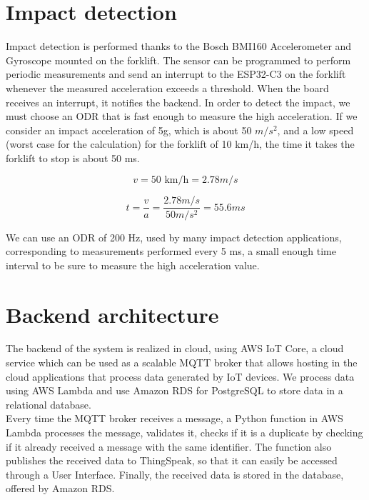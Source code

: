 \section{Impact detection}
Impact detection is performed thanks to the Bosch BMI160 Accelerometer and Gyroscope mounted on the forklift. The sensor can be programmed to perform periodic measurements and send an interrupt to the ESP32-C3 on the forklift whenever the measured acceleration exceeds a threshold. When the board receives an interrupt, it notifies the backend. In order to detect the impact, we must choose an ODR that is fast enough to measure the high acceleration.  If we consider an impact acceleration of 5g, which is about 50 $m/s^2$, and a low  speed (worst case for the calculation) for the forklift of 10 km/h, the time it takes the forklift to stop is about 50 ms.

\begin{equation}
v = 50 \text{ km/h} = 2.78 m/s
\end{equation}

\begin{equation}
t = \frac{v}{a} = \frac{2.78 m/s}{50 m/s^2} = 55.6 ms
\end{equation}

We can use an ODR of 200 Hz, used by many impact detection applications, corresponding to measurements performed every 5 ms, a small enough time interval to be sure to measure the high acceleration value.

\section{Backend architecture}
The backend of the system is realized in cloud, using AWS IoT Core, a cloud service which can be used as a scalable MQTT broker that allows hosting in the cloud applications that process data generated by IoT devices. We process data using AWS Lambda and use Amazon RDS for PostgreSQL to store data in a relational database.\\
Every time the MQTT broker receives a message, a Python function in AWS Lambda processes the message, validates it, checks if it is a duplicate by checking if it already received a message with the same identifier. The function also publishes the received data to ThingSpeak, so that it can easily be accessed through a User Interface. Finally, the received data is stored in the database, offered by Amazon RDS.
